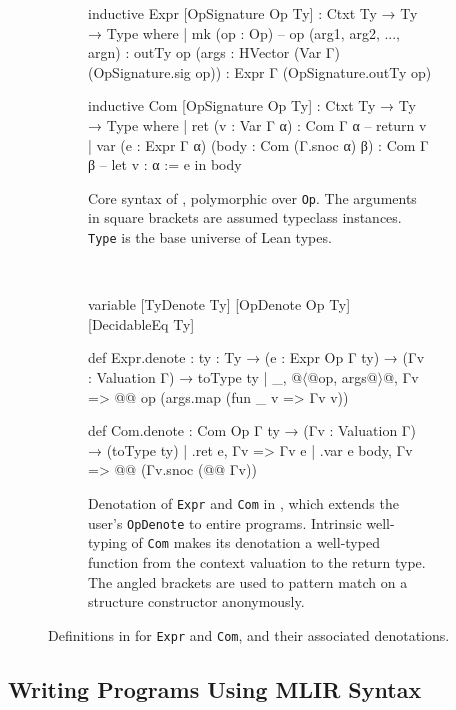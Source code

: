 \begin{figure}
\begin{subfigure}[b]{\textwidth}
\begin{lean}

inductive Expr [OpSignature Op Ty] : Ctxt Ty → Ty → Type where
| mk (op : Op) -- op (arg1, arg2, ..., argn) : outTy op
  (args : HVector (Var Γ) (OpSignature.sig op)) : Expr Γ (OpSignature.outTy op)

inductive Com [OpSignature Op Ty] : Ctxt Ty → Ty → Type where
| ret (v : Var Γ α) : Com Γ α -- return v
| var (e : Expr Γ α) (body : Com (Γ.snoc α) β) : Com Γ β -- let v : α := e in body
\end{lean}
\caption{\label{fig:mlir:iexpr-icom-def} Core syntax of , polymorphic over \texttt{Op}.
The arguments in square brackets are assumed typeclass instances. \texttt{Type} is the base universe of Lean types. }
\end{subfigure}\\
\vspace{2em}
\begin{subfigure}[b]{\textwidth}
\begin{lean}[escapeinside=@@]
variable [TyDenote Ty] [OpDenote Op Ty] [DecidableEq Ty]

def Expr.denote : {ty : Ty} → (e : Expr Op Γ ty) → (Γv : Valuation Γ) → toType ty
| _, @$\langle$@op, args@$\rangle$@, Γv => @@ op (args.map (fun _ v => Γv v))

def Com.denote : Com Op Γ ty → (Γv : Valuation Γ) → (toType ty)
| .ret e, Γv => Γv e
| .var e body, Γv => @@ (Γv.snoc (@@ Γv))
\end{lean}
\caption{\label{fig:mlir:iexpr-icom-denote}Denotation of \texttt{Expr} and \texttt{Com} in , which extends the user's \texttt{OpDenote}
to entire programs. Intrinsic well-typing of \texttt{Com} makes its denotation
a well-typed function from the context valuation to the return type. The angled brackets are used to pattern match on a structure constructor anonymously. }
\end{subfigure}
\caption{Definitions in  for \texttt{Expr} and \texttt{Com}, and their associated denotations.}
\end{figure}

\subsection{Writing \texorpdfstring{}{LeanMLIR(X)} Programs Using MLIR Syntax}
\label{sec:mlir:writing-mlirnatural-programs-in-mlir-syntax}

